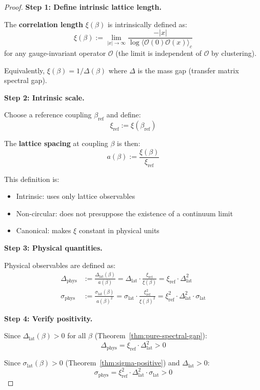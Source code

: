 \begin{proof}
\textbf{Step 1: Define intrinsic lattice length.}

The \textbf{correlation length} $\xi(\beta)$ is intrinsically defined as:
\[
\xi(\beta) := \lim_{|x| \to \infty} \frac{-|x|}{\log\langle \mathcal{O}(0)\mathcal{O}(x)\rangle_c}
\]
for any gauge-invariant operator $\mathcal{O}$ (the limit is independent of $\mathcal{O}$
by clustering).

Equivalently, $\xi(\beta) = 1/\Delta(\beta)$ where $\Delta$ is the mass gap 
(transfer matrix spectral gap).

\textbf{Step 2: Intrinsic scale.}

Choose a reference coupling $\beta_{\text{ref}}$ and define:
\[
\xi_{\text{ref}} := \xi(\beta_{\text{ref}})
\]

The \textbf{lattice spacing} at coupling $\beta$ is then:
\[
a(\beta) := \frac{\xi(\beta)}{\xi_{\text{ref}}}
\]

This definition is:
\begin{itemize}
\item Intrinsic: uses only lattice observables
\item Non-circular: does not presuppose the existence of a continuum limit
\item Canonical: makes $\xi$ constant in physical units
\end{itemize}

\textbf{Step 3: Physical quantities.}

Physical observables are defined as:
\begin{align}
\Delta_{\text{phys}} &:= \frac{\Delta_{\text{lat}}(\beta)}{a(\beta)} 
= \Delta_{\text{lat}} \cdot \frac{\xi_{\text{ref}}}{\xi(\beta)} 
= \xi_{\text{ref}} \cdot \Delta_{\text{lat}}^2 \\
\sigma_{\text{phys}} &:= \frac{\sigma_{\text{lat}}(\beta)}{a(\beta)^2}
= \sigma_{\text{lat}} \cdot \frac{\xi_{\text{ref}}^2}{\xi(\beta)^2}
= \xi_{\text{ref}}^2 \cdot \Delta_{\text{lat}}^2 \cdot \sigma_{\text{lat}}
\end{align}

\textbf{Step 4: Verify positivity.}

Since $\Delta_{\text{lat}}(\beta) > 0$ for all $\beta$ (Theorem~\ref{thm:pure-spectral-gap}):
\[
\Delta_{\text{phys}} = \xi_{\text{ref}} \cdot \Delta_{\text{lat}}^2 > 0
\]

Since $\sigma_{\text{lat}}(\beta) > 0$ (Theorem~\ref{thm:sigma-positive}) and 
$\Delta_{\text{lat}} > 0$:
\[
\sigma_{\text{phys}} = \xi_{\text{ref}}^2 \cdot \Delta_{\text{lat}}^2 \cdot \sigma_{\text{lat}} > 0
\]


\end{proof}

